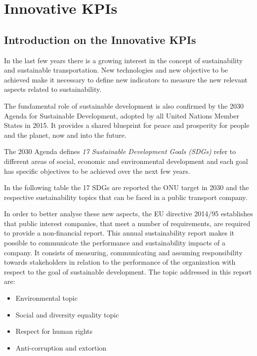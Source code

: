 \chapter{Innovative KPIs}
\label{ch:Innovative}
\section{Introduction on the Innovative KPIs}
\label{sec:Intro_Innvovative}
In the last few years there is a growing interest in the concept of sustainability and sustainable transportation. New technologies and new objective to be achieved make it necessary to define new indicators to measure the new relevant aspects related to sustainability.

The fundamental role of sustainable development is also confirmed by the 2030 Agenda for Sustainable Development, adopted by all United Nations Member States in 2015. It provides a shared blueprint for peace and prosperity for people and the planet, now and into the future. 

The 2030 Agenda defines \emph{17 Sustainable Development Goals (SDGs)}\cite{sdgs} refer to different areas of social, economic and environmental development and each goal has specific objectives to be achieved over the next few years. 

In the following table the 17 SDGs are reported the ONU target in 2030 and the respective sustainability topics that can be faced in a public transport company.




In order to better analyse these new aspects, the EU directive 2014/95\cite{directive201495eu} establishes that public interest companies, that meet a number of requirements, are required to provide a non-financial report. This annual sustainability report makes it possible to communicate the performance and sustainability impacts of a company. It consists of measuring, communicating and assuming responsibility towards stakeholders in relation to the performance of the organization with respect to the goal of sustainable development. The topic addressed in this report are:

\begin{itemize}
    \item Environmental topic
    \item Social and diversity equality topic
    \item Respect for human rights
    \item Anti-corruption and extortion
\end{itemize}

